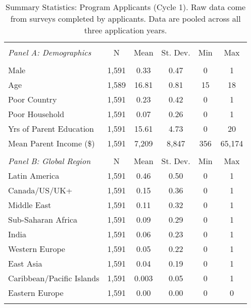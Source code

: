     
    \newpage
    
    \begin{table}[!htbp]
        \centering
        \caption{Summary Statistics: Program Applicants (Cycle 1). Raw data come from surveys completed by applicants. Data are pooled across all three application years. }
        \label{tab:c1_demo}
    \begin{tabular}{@{\extracolsep{5pt}}lccccc} 
    \\[-1.8ex]\hline 
    \hline \\[-1.8ex] 
    \emph{Panel A: Demographics} & \multicolumn{1}{c}{N} & \multicolumn{1}{c}{Mean} & \multicolumn{1}{c}{St. Dev.} & \multicolumn{1}{c}{Min} & \multicolumn{1}{c}{Max} \\ 
    \hline \\[-1.8ex] 
    Male & 1,591 & 0.33 & 0.47 & 0 & 1 \\ 
    Age & 1,589 & 16.81 & 0.81 & 15 & 18 \\ 
    Poor Country & 1,591 & 0.23 & 0.42 & 0 & 1 \\ 
    Poor Household & 1,591 & 0.07 & 0.26 & 0 & 1 \\ 
    Yrs of Parent Education & 1,591 & 15.61 & 4.73 & 0 & 20 \\ 
    Mean Parent Income (\$) & 1,591 & 7,209 & 8,847 & 356 & 65,174 \\ 
    \hline
    & & & & & \\
    \emph{Panel B: Global Region} & \multicolumn{1}{c}{N} & \multicolumn{1}{c}{Mean} & \multicolumn{1}{c}{St. Dev.} & \multicolumn{1}{c}{Min} & \multicolumn{1}{c}{Max} \\ 
    \hline
    Latin America & 1,591 & 0.46 & 0.50 & 0 & 1 \\ 
    Canada/US/UK+ & 1,591 & 0.15 & 0.36 & 0 & 1 \\ 
    Middle East & 1,591 & 0.11 & 0.32 & 0 & 1 \\ 
    Sub-Saharan Africa & 1,591 & 0.09 & 0.29 & 0 & 1 \\ 
    India & 1,591 & 0.06 & 0.23 & 0 & 1 \\ 
    Western Europe & 1,591 & 0.05 & 0.22 & 0 & 1 \\ 
    East Asia & 1,591 & 0.04 & 0.19 & 0 & 1 \\ 
    Caribbean/Pacific Islands & 1,591 & 0.003 & 0.05 & 0 & 1 \\ 
    Eastern Europe & 1,591 & 0.00 & 0.00 & 0 & 0 \\ 
    \hline \hline \\[-1.8ex] 
    \end{tabular} 
    \end{table} 
    
